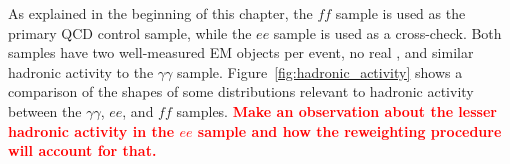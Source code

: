 \documentclass[dissertation.tex]{subfiles}
\begin{document}
As explained in the beginning of this chapter, the $\mathit{ff}$ sample is used as the primary QCD control sample, while the $ee$ sample is used as a cross-check.  Both samples have two well-measured EM objects per event, no real \MET, and similar hadronic activity to the $\gamma\gamma$ sample.  Figure~\ref{fig:hadronic_activity} shows a comparison of the shapes of some distributions relevant to hadronic activity between the $\gamma\gamma$, $ee$, and $\mathit{ff}$ samples.  \textcolor{red}{\textbf{Make an observation about the lesser hadronic activity in the $ee$ sample and how the reweighting procedure will account for that.}}

\end{document}

